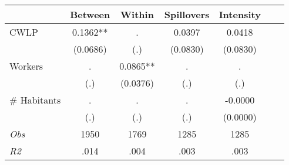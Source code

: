 \begin{tabular}{l*{6}{c}}\hline&\multicolumn{1}{c}{Between}&\multicolumn{1}{c}{Within}&\multicolumn{1}{c}{Spillovers}&\multicolumn{1}{c}{Intensity}\\ \hline 
CWLP & 0.1362** & . & 0.0397 & 0.0418 \\
 & (0.0686) & (.) & (0.0830) & (0.0830) \\
Workers & . & 0.0865** & . & . \\
 & (.) & (0.0376) & (.) & (.) \\
\# Habitants & . & . & . & -0.0000 \\
  & (.) & (.) & (.) & (0.0000) \\
\hline \textit{Obs} & 1950 & 1769 & 1285 & 1285  \\ \textit{R2} & .014 & .004 & .003 & .003 \\ \hline \end{tabular}
